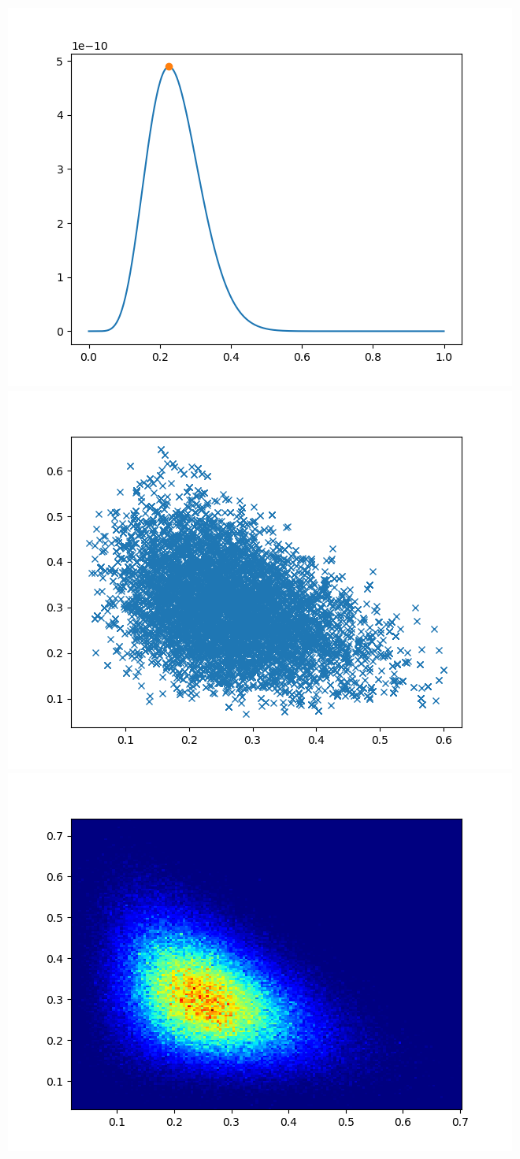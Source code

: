 \documentclass[pt12]{article}
\begin{document}
\newpage

\begin{center}
\includegraphics[scale=0.5]{hip24.png}\\
\includegraphics[scale=0.5]{sc24.png}\\
\includegraphics[scale=0.5]{den24.png}\\
\end{center}
\end{document}
